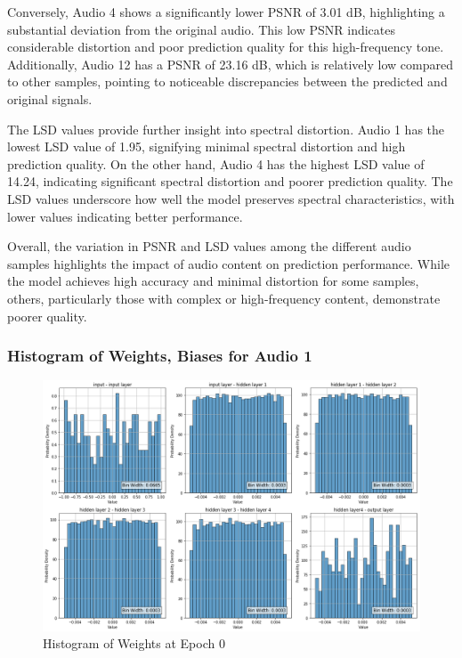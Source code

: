\documentclass{ioereport}
\begin{document}
Conversely, Audio 4 shows a significantly lower PSNR of 3.01 dB, highlighting a substantial deviation from the original audio. This low PSNR indicates considerable distortion and poor prediction quality for this high-frequency tone. Additionally, Audio 12 has a PSNR of 23.16 dB, which is relatively low compared to other samples, pointing to noticeable discrepancies between the predicted and original signals.

The LSD values provide further insight into spectral distortion. Audio 1 has the lowest LSD value of 1.95, signifying minimal spectral distortion and high prediction quality. On the other hand, Audio 4 has the highest LSD value of 14.24, indicating significant spectral distortion and poorer prediction quality. The LSD values underscore how well the model preserves spectral characteristics, with lower values indicating better performance.

Overall, the variation in PSNR and LSD values among the different audio samples highlights the impact of audio content on prediction performance. While the model achieves high accuracy and minimal distortion for some samples, others, particularly those with complex or high-frequency content, demonstrate poorer quality.


\subsubsection{Histogram of Weights, Biases for Audio 1}


    \begin{figure}[H]
        \centering
        \includegraphics[width=\linewidth]{assets/audio histogram/epoch0Weight.png}
        \caption{Histogram of Weights at Epoch 0}
        \label{fig:audio-weight-0}
    \end{figure}
\end{document}
